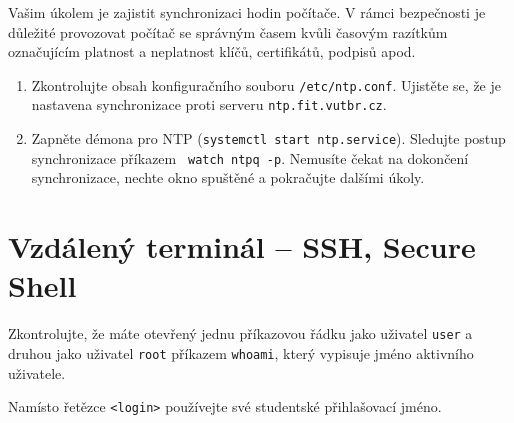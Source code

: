 \documentclass[a4paper,11pt]{article}
\begin{document}
Vašim úkolem je zajistit synchronizaci hodin počítače. V rámci bezpečnosti je
důležité provozovat počítač se správným časem kvůli časovým razítkům
označujícím platnost a neplatnost klíčů, certifikátů, podpisů apod.

\begin{enumerate}

  \item Zkontrolujte obsah konfiguračního souboru {\tt /etc/ntp.conf}. Ujistěte
    se, že je nastavena synchronizace proti serveru {\tt ntp.fit.vutbr.cz}.

  \item Zapněte démona pro NTP ({\tt systemctl start ntp.service}).
    Sledujte postup synchronizace příkazem {\tt
    watch ntpq -p}. Nemusíte čekat na dokončení synchronizace, nechte okno
    spuštěné a pokračujte dalšími úkoly.

\end{enumerate}

\section{Vzdálený terminál -- SSH, Secure Shell}

Zkontrolujte, že máte otevřený jednu příkazovou řádku jako uživatel
{\tt user} a druhou jako uživatel {\tt root} příkazem {\tt whoami}, který vypisuje jméno aktivního
uživatele.

Namísto řetězce {\tt <login>} používejte své studentské přihlašovací jméno.
\end{document}
